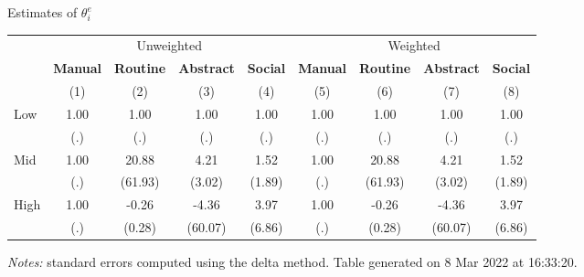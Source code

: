 \begin{center}
\begin{threeparttable}[!h]
\caption{Estimates of $\theta_{i}^e$}
\begin{tabular}{lcccccccc}
\toprule
\toprule
&\multicolumn{4}{c}{Unweighted}&\multicolumn{4}{c}{Weighted} \\
&\multicolumn{1}{c}{\textbf{Manual}}&\multicolumn{1}{c}{\textbf{Routine}}&\multicolumn{1}{c}{\textbf{Abstract}}&\multicolumn{1}{c}{\textbf{Social}}&\multicolumn{1}{c}{\textbf{Manual}}&\multicolumn{1}{c}{\textbf{Routine}}&\multicolumn{1}{c}{\textbf{Abstract}}&\multicolumn{1}{c}{\textbf{Social}} \\
\textbf{}&\multicolumn{1}{c}{(1)}&\multicolumn{1}{c}{(2)}&\multicolumn{1}{c}{(3)}&\multicolumn{1}{c}{(4)}&\multicolumn{1}{c}{(5)}&\multicolumn{1}{c}{(6)}&\multicolumn{1}{c}{(7)}&\multicolumn{1}{c}{(8)} \\
\midrule
Low                 &        1.00&        1.00&        1.00&        1.00&        1.00&        1.00&        1.00&        1.00\\
                    &         (.)&         (.)&         (.)&         (.)&         (.)&         (.)&         (.)&         (.)\\
Mid                 &        1.00&       20.88&        4.21&        1.52&        1.00&       20.88&        4.21&        1.52\\
                    &         (.)&     (61.93)&      (3.02)&      (1.89)&         (.)&     (61.93)&      (3.02)&      (1.89)\\
High                &        1.00&       -0.26&       -4.36&        3.97&        1.00&       -0.26&       -4.36&        3.97\\
                    &         (.)&      (0.28)&     (60.07)&      (6.86)&         (.)&      (0.28)&     (60.07)&      (6.86)\\
\bottomrule
\bottomrule
\end{tabular}
\begin{tablenotes}
\item \footnotesize \textit{Notes:} standard errors computed using the delta method. Table generated on  8 Mar 2022 at 16:33:20.
\end{tablenotes}
\end{threeparttable}
\end{center}
